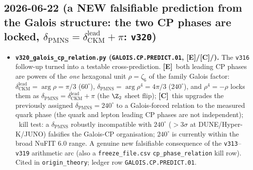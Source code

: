 \documentclass[11pt]{article}
\providecommand{\mE}{\textbf{[E]}}\providecommand{\mC}{\textbf{[C]}}
\begin{document}
\subsection*{2026-06-22 (a NEW falsifiable prediction from the Galois structure: the two CP phases are locked, $\delta_{\mathrm{PMNS}}=\delta_{\mathrm{CKM}}^{\mathrm{lead}}+\pi$: \texttt{v320})}
\begin{itemize}
\item \textbf{\texttt{v320\_galois\_cp\_relation.py} (\texttt{GALOIS.CP.PREDICT.01}, \mE/\mC/\mX).} The \texttt{v316}
  follow-up turned into a testable cross-prediction. \mE\ both leading CP phases are powers of the \emph{one}
  hexagonal unit $\rho=\zeta_6$ of the family Galois factor: $\delta_{\mathrm{CKM}}^{\mathrm{lead}}=\arg\rho=\pi/3$
  ($60^\circ$), $\delta_{\mathrm{PMNS}}=\arg\rho^4=4\pi/3$ ($240^\circ$), and $\rho^4=-\rho$ locks them as
  $\delta_{\mathrm{PMNS}}=\delta_{\mathrm{CKM}}^{\mathrm{lead}}+\pi$ (the $\Z_2$ sheet flip); \mC\ this upgrades the
  previously assigned $\delta_{\mathrm{PMNS}}=240^\circ$ to a Galois-forced relation to the measured quark phase
  (the quark and lepton leading CP phases are not independent); \mX\ kill test: a $\delta_{\mathrm{PMNS}}$ robustly
  incompatible with $240^\circ$ ($>3\sigma$ at DUNE/Hyper-K/JUNO) falsifies the Galois-CP organisation; $240^\circ$
  is currently within the broad NuFIT 6.0 range. A genuine new falsifiable consequence of the \texttt{v313}--%
  \texttt{v319} arithmetic arc (also a \texttt{freeze\_file.csv} \texttt{cp\_phase\_relation} kill row). Cited in
  \texttt{origin\_theory}; ledger row \texttt{GALOIS.CP.PREDICT.01}.
\end{itemize}
\end{document}
